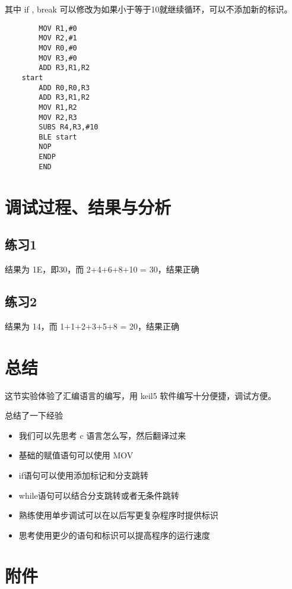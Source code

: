 \documentclass[a4paper,10pt,UTF8]{paper}
\numberwithin{equation}{section}
\numberwithin{figure}{section}
\begin{document}
其中 if , break 可以修改为如果小于等于10就继续循环，可以不添加新的标识。


\begin{verbatim}
        MOV R1,#0
        MOV R2,#1
        MOV R0,#0
        MOV R3,#0
        ADD R3,R1,R2
    start
        ADD R0,R0,R3
        ADD R3,R1,R2
        MOV R1,R2
        MOV R2,R3
        SUBS R4,R3,#10
        BLE start
        NOP
        ENDP
        END

\end{verbatim}

\section{调试过程、结果与分析}

\subsection{练习1}

结果为 1E，即30，而 2+4+6+8+10 = 30，结果正确

\subsection{练习2}

结果为 14，而 1+1+2+3+5+8 = 20，结果正确

\section{总结}

这节实验体验了汇编语言的编写，用 keil5 软件编写十分便捷，调试方便。

总结了一下经验

\begin{itemize}
    \item 我们可以先思考 c 语言怎么写，然后翻译过来
    \item 基础的赋值语句可以使用 MOV
    \item if语句可以使用添加标记和分支跳转
    \item while语句可以结合分支跳转或者无条件跳转
    \item 熟练使用单步调试可以在以后写更复杂程序时提供标识
    \item 思考使用更少的语句和标识可以提高程序的运行速度
\end{itemize}

\section{附件}
\end{document}
